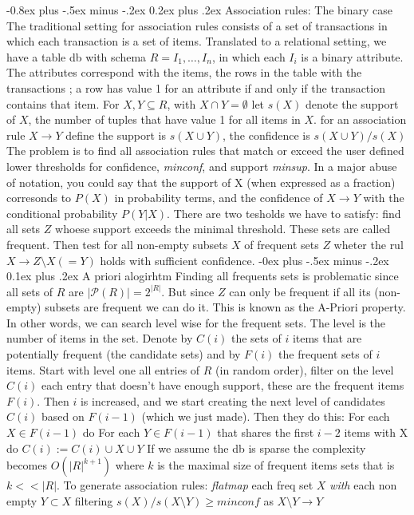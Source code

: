 \documentclass[8pt,landscape]{extarticle}
\makeatletter
\renewcommand{\subsection}{\@startsection{subsection}{2}{0mm}%
                                {-0.8ex plus -.5ex minus -.2ex}%
                                {0.2ex plus .2ex}%
                                {\normalfont\normalsize\bfseries}}
\renewcommand{\subsubsection}{\@startsection{subsubsection}{3}{0mm}%
                                {-0ex plus -.5ex minus -.2ex}%
                                {0.1ex plus .2ex}%
                                {\normalfont\small\bfseries}}
\makeatother
\begin{document}
\begin{multicols}{3}
\subsection{Association rules: The binary case}
The traditional setting for association rules consists of a set of transactions
in which each transaction is a set of items.
Translated to a relational setting,
we have a table db with schema $R = {I_1 , \dots, I_n }$,
in which each $I_i$ is a binary attribute.
The attributes correspond with the items,
the rows in the table with the transactions
; a row has value 1 for an attribute if and only if the transaction contains
that item.
For $X,Y \subseteq R$, with $X\cap Y=\emptyset$ let $s(X)$ denote the support of
$X$, the number of tuples that have value 1 for all items in $X$. for an
association rule $X \to Y$ define the support is $s(X\cup Y)$, the confidence is
$s(X\cup Y)/s(X)$
The problem is to find all association rules that match or exceed the user
defined lower thresholds for confidence, \emph{minconf}, and support
\emph{minsup}.
In a major abuse of notation,
you could say that the support of X (when expressed as a fraction) corresonds
to $P (X)$ in probability terms,
and the confidence of $X \to Y$ with the conditional probability $P (Y | X)$.
There are two tesholds we have to satisfy:
find all sets $Z$ whoese support exceeds the minimal threshold. These sets are
called frequent. Then test for all non-empty subsets $X$ of frequent sets $Z$
wheter the rul $X \to Z \setminus X(=Y)$ holds with sufficient confidence.
\subsubsection{A priori alogirhtm}
Finding all frequents sets is problematic since all sets of $R$ are
$|\mathcal{P}(R)|=2^{|R|}$. But since $Z$ can only be frequent if all its
(non-empty) subsets are frequent we can do it.
This is known as the A-Priori property. In other words, we can search level wise
for the frequent sets.
The level is the number of items in the set. Denote by $C(i)$ the sets of $i$
items that are potentially frequent (the candidate sets) and by $F (i)$
the frequent sets of $i$ items.
Start with level one all entries of $R$ (in random order),
filter on the level $C(i)$ each entry
that doesn't have enough support, these are the frequent items $F(i)$.
Then $i$ is increased, and we start creating the
next level of candidates $C(i)$ based on $F(i-1)$ (which we just made).
Then they do this:
For each $X \in F (i − 1)$ do
For each $Y \in F (i − 1)$ that shares the first $i − 2$ items with X do
$C(i) := C(i) \cup {X \cup Y }$
If we assume the db is sparse the complexity becomes $O(|R|^{k+1})$ where $k$
is the maximal size of frequent items sets that is $k << |R|$.
To generate association rules:
\emph{flatmap} each freq set $X$ \emph{with} each non empty $Y \subset X$ filtering
$s(X)/s(X\setminus Y)\geq minconf$ as $X \setminus Y \to Y $

\end{multicols}
\end{document}
